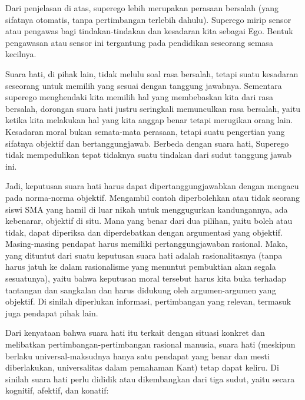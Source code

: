 \documentclass[11pt,twoside,a5paper,openany]{memoir}
\begin{document}
Dari penjelasan di atas, superego lebih merupakan perasaan bersalah
(yang sifatnya otomatis, tanpa pertimbangan terlebih dahulu). Superego
mirip sensor atau pengawas bagi tindakan-tindakan dan kesadaran kita
sebagai Ego. Bentuk pengawasan atau sensor ini tergantung pada
pendidikan seseorang semasa kecilnya.

Suara hati, di pihak lain, tidak melulu soal rasa bersalah, tetapi suatu
kesadaran seseorang untuk memilih yang sesuai dengan tanggung jawabnya.
Sementara superego menghendaki kita memilih hal yang membebaskan kita
dari rasa bersalah, dorongan suara hati justru seringkali memunculkan
rasa bersalah, yaitu ketika kita melakukan hal yang kita anggap benar
tetapi merugikan orang lain. Kesadaran moral bukan semata-mata perasaan,
tetapi suatu pengertian yang sifatnya objektif dan bertanggungjawab.
Berbeda dengan suara hati, Superego tidak mempedulikan tepat tidaknya
suatu tindakan dari sudut tanggung jawab ini.

Jadi, keputusan suara hati harus dapat dipertanggungjawabkan dengan
mengacu pada norma-norma objektif. Mengambil contoh diperbolehkan atau
tidak seorang siswi SMA yang hamil di luar nikah untuk menggugurkan
kandungannya, ada kebenarar, objektif di situ. Mana yang benar dari dua
pilihan, yaitu boleh atau tidak, dapat diperiksa dan diperdebatkan
dengan argumentasi yang objektif. Masing-masing pendapat harus memiliki
pertanggungjawaban rasional. Maka, yang dituntut dari suatu keputusan
suara hati adalah rasionalitasnya (tanpa harus jatuh ke dalam
rasionalisme yang menuntut pembuktian akan segala sesuatunya), yaitu
bahwa keputusan moral tersebut harus kita buka terhadap tantangan dan
sangkalan dan harus didukung oleh argumen-argumen yang objektif. Di
sinilah diperlukan informasi, pertimbangan yang relevan, termasuk juga
pendapat pihak lain.

Dari kenyataan bahwa suara hati itu terkait dengan situasi konkret dan
melibatkan pertimbangan-pertimbangan rasional manusia, suara hati
(meskipun berlaku universal-maksudnya hanya satu pendapat yang benar dan
mesti diberlakukan, universalitas dalam pemahaman Kant) tetap dapat
keliru. Di sinilah suara hati perlu dididik atau dikembangkan dari tiga
sudut, yaitu secara kognitif, afektif, dan konatif:
\end{document}
